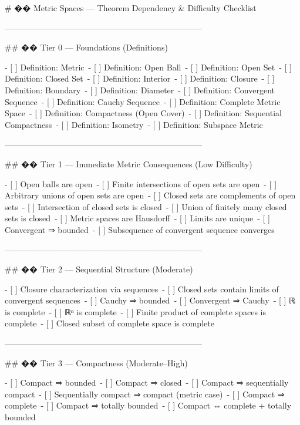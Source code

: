 # �� Metric Spaces --- Theorem Dependency & Difficulty Checklist

------------------------------------------------------------------------

## �� Tier 0 --- Foundations (Definitions)

-   [ ] Definition: Metric\
-   [ ] Definition: Open Ball\
-   [ ] Definition: Open Set\
-   [ ] Definition: Closed Set\
-   [ ] Definition: Interior\
-   [ ] Definition: Closure\
-   [ ] Definition: Boundary\
-   [ ] Definition: Diameter\
-   [ ] Definition: Convergent Sequence\
-   [ ] Definition: Cauchy Sequence\
-   [ ] Definition: Complete Metric Space\
-   [ ] Definition: Compactness (Open Cover)\
-   [ ] Definition: Sequential Compactness\
-   [ ] Definition: Isometry\
-   [ ] Definition: Subspace Metric

------------------------------------------------------------------------

## �� Tier 1 --- Immediate Metric Consequences (Low Difficulty)

-   [ ] Open balls are open\
-   [ ] Finite intersections of open sets are open\
-   [ ] Arbitrary unions of open sets are open\
-   [ ] Closed sets are complements of open sets\
-   [ ] Intersection of closed sets is closed\
-   [ ] Union of finitely many closed sets is closed\
-   [ ] Metric spaces are Hausdorff\
-   [ ] Limits are unique\
-   [ ] Convergent ⇒ bounded\
-   [ ] Subsequence of convergent sequence converges

------------------------------------------------------------------------

## �� Tier 2 --- Sequential Structure (Moderate)

-   [ ] Closure characterization via sequences\
-   [ ] Closed sets contain limits of convergent sequences\
-   [ ] Cauchy ⇒ bounded\
-   [ ] Convergent ⇒ Cauchy\
-   [ ] ℝ is complete\
-   [ ] ℝⁿ is complete\
-   [ ] Finite product of complete spaces is complete\
-   [ ] Closed subset of complete space is complete

------------------------------------------------------------------------

## �� Tier 3 --- Compactness (Moderate--High)

-   [ ] Compact ⇒ bounded\
-   [ ] Compact ⇒ closed\
-   [ ] Compact ⇒ sequentially compact\
-   [ ] Sequentially compact ⇒ compact (metric case)\
-   [ ] Compact ⇒ complete\
-   [ ] Compact ⇒ totally bounded\
-   [ ] Compact ⇔ complete + totally bounded


